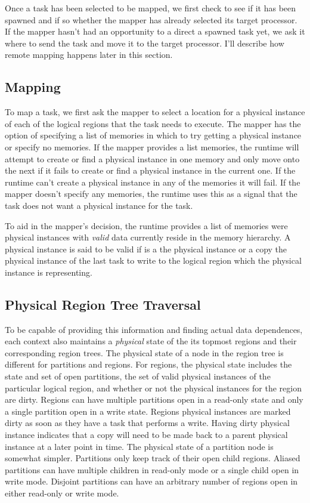 Once a task has been selected to be mapped, we first check to see if it has been spawned and if 
so whether the mapper has already selected its target processor.  If the mapper hasn't had an 
opportunity to a direct a spawned task yet, we ask it where to send the task and move it to the 
target processor.  I'll describe how remote mapping happens later in this section.

\subsection{Mapping}
To map a task, we first ask the mapper to select a location for a physical instance of each of 
the logical regions that the task needs to execute.  The mapper has the option of specifying 
a list of memories in which to try getting a physical instance or specify no memories.  If the 
mapper provides a list memories, the runtime will attempt to create or find a physical instance 
in one memory and only move onto the next if it fails to create or find a physical instance in 
the current one.  If the runtime can't create a physical instance in any of the memories it 
will fail.  If the mapper doesn't specify any memories, the runtime uses this as a signal that 
the task does not want a physical instance for the task.

To aid in the mapper's decision, the runtime provides a list of memories were physical instances with 
{\em valid} data currently reside in the memory hierarchy. A physical instance is said to be valid if
is a the physical instance or a copy the physical instance of the last task to write to the logical
region which the physical instance is representing.  

\subsection{Physical Region Tree Traversal}
To be capable of providing this information and finding actual data dependences,
each context also maintains a {\em physical} state of the its topmost regions and their 
corresponding region trees.  The physical state of a node in the region tree is different for 
partitions and regions.  For regions, the physical state includes the state and set of open partitions, 
the set of valid physical instances of the particular logical region, and whether or not the physical 
instances for the region are dirty.  Regions can have multiple partitions open in a read-only state 
and only a single partition open in a write state.  Regions physical instances are marked dirty as 
soon as they have a task that performs a write.  Having dirty physical instance indicates that a 
copy will need to be made back to a parent physical instance at a later point in time.  The physical 
state of a partition node is somewhat simpler.  Partitions only keep track of their open child 
regions.  Aliased partitions can have multiple children in read-only mode or a single child open in 
write mode.  Disjoint partitions can have an arbitrary number of regions open in either read-only 
or write mode.

